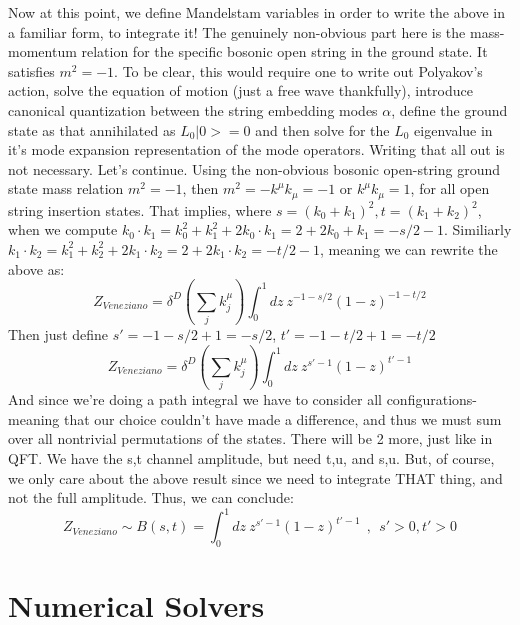 \documentclass{article}
\begin{document}
Now at this point, we define Mandelstam variables in order to write the above in a familiar form, to integrate it! The genuinely non-obvious part here is the mass-momentum relation for the specific bosonic open string in the ground state. It satisfies $m^2=-1$. To be clear, this would require one to write out Polyakov's action, solve the equation of motion (just a free wave thankfully), introduce canonical quantization between the string embedding modes $\alpha$, define the ground state as that annihilated as $L_0|0>=0$ and then solve for the $L_0$ eigenvalue in it's mode expansion representation of the mode operators. Writing that all out is not necessary. Let's continue. Using the non-obvious bosonic open-string ground state mass relation $m^2=-1$, then  $m^2=-k^\mu k_\mu=-1$ or $k^\mu k_\mu =1$, for all open string insertion states. That implies, where $s=(k_0+k_1)^2,t=(k_1+k_2)^2$, when we compute $k_0 \cdot k_1=k_0^2+k_1^2+2k_0\cdot k_1=2+2 k_0+k_1=-s/2-1$. Similiarly $k_1\cdot k_2=k_1^2+k_2^2+2k_1\cdot k_2=2+2 k_1 \cdot k_2=-t/2-1$, meaning we can rewrite the above as:
\begin{equation}
Z_{Veneziano}=\delta^D(\sum_j k_j^\mu)\int_0^1dz\:z^{-1-s/2}(1-z)^{-1-t/2}
\end{equation}
Then just define $s'=-1-s/2+1=-s/2$, $t'=-1-t/2+1=-t/2$
\begin{equation}
Z_{Veneziano}=\delta^D(\sum_j k_j^\mu)\int_0^1dz\:z^{s'-1}(1-z)^{t'-1}
\end{equation}
And since we're doing a path integral we have to consider all configurations-meaning that our choice couldn't have made a difference, and thus we must sum over all nontrivial permutations of the states. There will be 2 more, just like in QFT. We have the s,t channel amplitude, but need t,u, and s,u. But, of course, we only care about the above result since we need to integrate THAT thing, and not the full amplitude. Thus, we can conclude:
\begin{equation}
    Z_{Veneziano} \sim B(s,t) = \int_0^1dz \:z^{s'-1}(1-z)^{t'-1}\:\:, \: \: s'>0,t'>0
\end{equation}

\section{Numerical Solvers}
\end{document}
